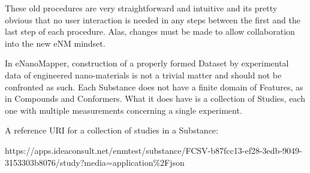 These old procedures are very straightforward and intuitive and its pretty 
obvious that no user interaction is needed in any steps between the first 
and the last step of each procedure. Alas, changes must be made to allow 
collaboration into the new eNM mindset.


In eNanoMapper, construction of a properly formed Dataset by experimental 
data of engineered nano-materials is not a trivial matter and should not be 
confronted as such. Each Substance does not have a finite domain of Features, 
as in Compounds and Conformers. What it does have is a collection of Studies, 
each one with multiple measurements concerning a single experiment. 

A reference URI for a collection of studies in a Substance: 

https://apps.ideaconsult.net/enmtest/substance/FCSV-b87fcc13-ef28-3edb-9049-3153303b8076/study?media=application\%2Fjson

